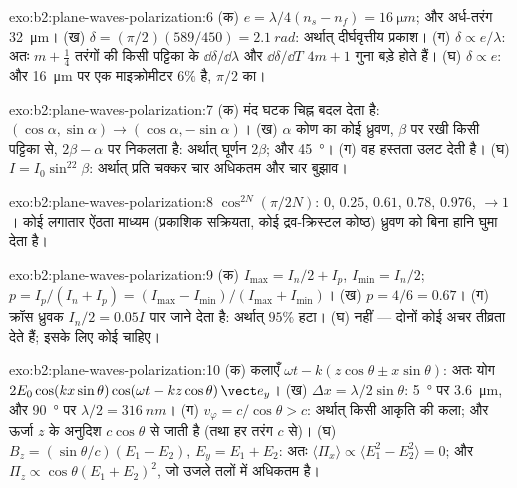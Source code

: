 \begin{solution}{exo:b2:plane-waves-polarization:6}
(क) $e = \lambda/4(n_s - n_f) = \qty{16}{\micro m}$; और अर्ध-तरंग \qty{32}{\micro m}। (ख) $\delta =
(\pi/2)(589/450) = \qty{2.1}{rad}$: अर्थात् दीर्घवृत्तीय प्रकाश। (ग) $\delta \propto e/\lambda$: अतः
$m + \tfrac14$ तरंगों की किसी पट्टिका के $\dd\delta/\dd\lambda$ और $\dd\delta/\dd T$
$4m + 1$ गुना बड़े होते हैं। (घ) $\delta \propto e$: और \qty{16}{\micro m} पर एक माइक्रोमीटर $6\%$ है, $\pi/2$ का।
\end{solution}

\begin{solution}{exo:b2:plane-waves-polarization:7}
(क) मंद घटक चिह्न बदल देता है: $(\cos\alpha, \sin\alpha) \to (\cos\alpha,
-\sin\alpha)$। (ख) $\alpha$ कोण का कोई ध्रुवण, $\beta$ पर रखी किसी पट्टिका से,
$2\beta - \alpha$ पर निकलता है: अर्थात् घूर्णन $2\beta$; और \qty{45}{\degree}। (ग) वह हस्तता
उलट देती है। (घ) $I = I_0\sin^22\beta$: अर्थात् प्रति चक्कर चार अधिकतम और चार
बुझाव।
\end{solution}

\begin{solution}{exo:b2:plane-waves-polarization:8}
$\cos^{2N}(\pi/2N)$: $0$, $0.25$, $0.61$, $0.78$, $0.976$, $\to 1$। कोई
लगातार ऐंठता माध्यम (प्रकाशिक सक्रियता, कोई द्रव-क्रिस्टल कोष्ठ)
ध्रुवण को बिना हानि घुमा देता है।
\end{solution}

\begin{solution}{exo:b2:plane-waves-polarization:9}
(क) $I_{\max} = I_n/2 + I_p$, $I_{\min} = I_n/2$; $p = I_p/(I_n + I_p) = (I_{\max} -
I_{\min})/(I_{\max} + I_{\min})$। (ख) $p = 4/6 = 0.67$। (ग) क्रॉस ध्रुवक
$I_n/2 = 0.05I$ पार जाने देता है: अर्थात् $95\%$ हटा। (घ) नहीं --- दोनों कोई अचर
तीव्रता देते हैं; इसके लिए कोई  चाहिए।
\end{solution}

\begin{solution}{exo:b2:plane-waves-polarization:10}
(क) कलाएँ $\omega t - k(z\cos\theta \pm x\sin\theta)$: अतः योग $2E_0\cos(kx\sin\theta)\cos(\omega t
- kz\cos\theta)\,\vect e_y$। (ख) $\Delta x = \lambda/2\sin\theta$: \qty{5}{\degree} पर \qty{3.6}{\micro m},
और \qty{90}{\degree} पर $\lambda/2 = \qty{316}{nm}$। (ग) $v_\varphi = c/\cos\theta > c$: अर्थात् किसी आकृति की
कला; और ऊर्जा $z$ के अनुदिश $c\cos\theta$ से जाती है (तथा हर तरंग $c$ से)।
(घ) $B_z = (\sin\theta/c)(E_1 - E_2)$, $E_y = E_1 + E_2$: अतः $\langle\Pi_x\rangle \propto
\langle E_1^2 - E_2^2\rangle = 0$; और $\Pi_z \propto \cos\theta(E_1 + E_2)^2$, जो उजले तलों में
अधिकतम है।
\end{solution}

